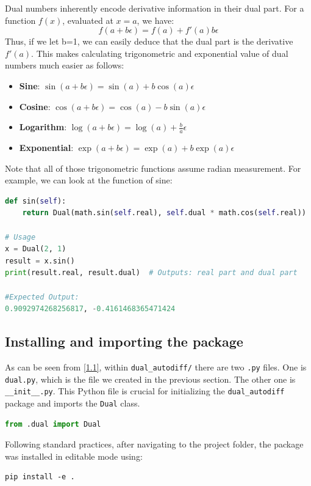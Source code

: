 \documentclass[12.5pt]{article}
\begin{document}
Dual numbers inherently encode derivative information in their dual part. For a function \( f(x) \), evaluated at \( x = a \), we have:
\[
f(a + b\epsilon) = f(a) + f'(a)b\epsilon
\]
Thus, if we let b=1, we can easily deduce that the dual part is the derivative \( f'(a) \). This makes calculating trigonometric and exponential value of dual numbers much easier as follows:

\begin{itemize}
    \item \textbf{Sine}:
    \(\sin(a + b\epsilon) = \sin(a) + b\cos(a)\epsilon\)
    \item \textbf{Cosine}:
    \(\cos(a + b\epsilon) = \cos(a) - b\sin(a)\epsilon\)
    \item \textbf{Logarithm}:
    \(\log(a + b\epsilon) = \log(a) + \frac{b}{a}\epsilon\)
    \item \textbf{Exponential}:
    \(\exp(a + b\epsilon) = \exp(a) + b\exp(a)\epsilon\)
\end{itemize}
Note that all of those trigonometric functions assume radian measurement.
For example, we can look at the function of sine:
\begin{lstlisting}[language=Python]
def sin(self):
    return Dual(math.sin(self.real), self.dual * math.cos(self.real))
    
# Usage
x = Dual(2, 1)
result = x.sin()
print(result.real, result.dual)  # Outputs: real part and dual part

#Expected Output:
0.9092974268256817, -0.4161468365471424
\end{lstlisting}

\subsection{Installing and importing the package}
As can be seen from \ref{1.1}, within \texttt{dual\_autodiff/} there are two \texttt{.py} files. One is \texttt{dual.py}, which is the file we created in the previous section. The other one is \texttt{\_\_init\_\_.py}.
This Python file is crucial for initializing the \texttt{dual\_autodiff} package and imports the \texttt{Dual} class.

\begin{lstlisting}[language=Python]
from .dual import Dual
\end{lstlisting}

Following standard practices, after navigating to the project folder, the package was installed in editable mode using:
\begin{verbatim}
pip install -e .
\end{verbatim}
\end{document}
